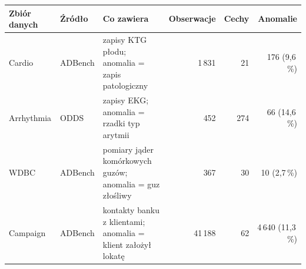 \begin{tabular}{llL{5.2cm}rrr}
\toprule
Zbiór danych & Źródło & Co zawiera & Obserwacje & Cechy & Anomalie \\
\midrule
Cardio & ADBench & zapisy KTG płodu; anomalia = zapis patologiczny & 1\,831 & 21 & 176 (9,6\,\%) \\
Arrhythmia & ODDS & zapisy EKG; anomalia = rzadki typ arytmii & 452 & 274 & 66 (14,6\,\%) \\
WDBC & ADBench & pomiary jąder komórkowych guzów; anomalia = guz złośliwy & 367 & 30 & 10 (2,7\,\%) \\
Campaign & ADBench & kontakty banku z klientami; anomalia = klient założył lokatę & 41\,188 & 62 & 4\,640 (11,3\,\%) \\
\bottomrule
\end{tabular}
